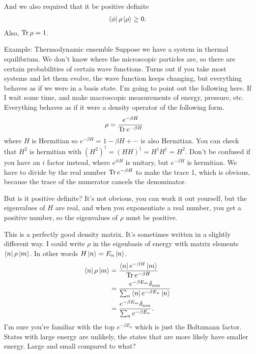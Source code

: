 And we also required that it be positive definite
\begin{align}
    \bra{\phi}\rho \ket{\rho} \ge 0.
\end{align}
Also,
$\Tr \rho = 1$.


Example: Thermodynamic ensemble
Suppose we have a system in thermal equilibrium.
We don't know where the microscopic particles are,
so there are certain probabilities of certain wave functions.
Turns out if you take most systems and let them evolve,
the wave function keeps changing,
but everything behaves as if we were in a basis state.
I'm going to point out the following here.
If I wait some time,
and make macroscopic measurements of energy, pressure, etc.
Everything behaves as if it were a density operator of the following form.
\begin{align}
    \rho &= \frac{e^{-\beta H}}{\Tr e^{-\beta H}}
\end{align}
where $H$ is Hermitian so $e^{-\beta H} = 1 - \beta H + \cdots$
is also Hermitian.
You can check that $H^2$ is hermitian with
$(H^2)^\dagger = (HH)^\dagger = H^\dagger H^\dagger = H^2$.
Don't be confused if you have an $i$ factor instead,
where $e^{itH}$ is unitary,
but $e^{-\beta H}$ is hermitian.
We have to divide by the real number $\Tr e^{-\beta H}$
to make the trace 1,
which is obvious,
because the trace of the numerator cancels the denominator.

But is it positive definite?
It's not obvious,
you can work it out yourself,
but the eigenvalues of $H$ are real,
and when you exponentiate a real number,
you get a positive number,
so the eigenvalues of $\rho$ must be positive.

This is a perfectly good density matrix.
It's sometimes written in a slightly different way.
I could write $\rho$ in the eigenbasis of energy
with matrix elements $\bra{n}\rho\ket{m}$.
In other words $H\ket{n} = E_n \ket{n}$.
\begin{align}
    \bra{n}\rho\ket{m} &=
    \frac{\bra{n} e^{-\beta H}\ket{m}}{\Tr e^{-\beta H}}\\
    &= \frac{e^{-\beta E_m} \delta_{nm}}{
        \sum_n \bra{n} e^{-\beta E_n}\ket{n}
    }\\
    &= \frac{e^{-\beta E_m} \delta_{nm}}{
        \sum_n e^{-\beta E_n}
    }.
\end{align}
I'm sure you're familiar with the top
$e^{-\beta E_n}$
which is just the Boltzmann factor.
States with large energy are unlikely,
the states that are more likely have smaller energy.
Large and small compared to what?

